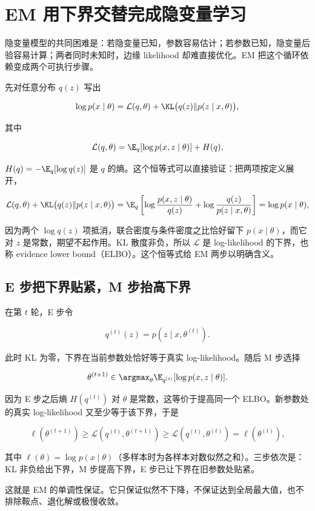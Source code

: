 \section{EM 用下界交替完成隐变量学习}

隐变量模型的共同困难是：若隐变量已知，参数容易估计；若参数已知，隐变量后验容易计算；两者同时未知时，边缘 likelihood 却难直接优化。EM 把这个循环依赖变成两个可执行步骤。

先对任意分布 \(q(z)\) 写出

\[
\log p(x\mid\theta)
=\mathcal L(q,\theta)
+\KL
\bigl(q(z)\|p(z\mid x,\theta)\bigr),
\]

其中

\[
\mathcal L(q,\theta)
=\E_q[\log p(x,z\mid\theta)]
+H(q),
\]

\(H(q)=-\E_q[\log q(z)]\) 是 \(q\) 的熵。这个恒等式可以直接验证：把两项按定义展开，

\[
\mathcal L(q,\theta)
+\KL\bigl(q(z)\|p(z\mid x,\theta)\bigr)
=\E_q\left[
\log\frac{p(x,z\mid\theta)}{q(z)}
+\log\frac{q(z)}{p(z\mid x,\theta)}
\right]
=\log p(x\mid\theta),
\]

因为两个 \(\log q(z)\) 项抵消，联合密度与条件密度之比恰好留下 \(p(x\mid\theta)\)，而它对 \(z\) 是常数，期望不起作用。KL 散度非负，所以 \(\mathcal L\) 是 log-likelihood 的下界，也称 evidence lower bound（ELBO）。这个恒等式给 EM 两步以明确含义。

\subsection{E 步把下界贴紧，M 步抬高下界}

在第 \(t\) 轮，E 步令

\[
q^{(t)}(z)
=p(z\mid x,\theta^{(t)}).
\]

此时 KL 为零，下界在当前参数处恰好等于真实 log-likelihood。随后 M 步选择

\[
\theta^{(t+1)}
\in\argmax_\theta
\E_{q^{(t)}}
[\log p(x,z\mid\theta)].
\]

因为 E 步之后熵 \(H(q^{(t)})\) 对 \(\theta\) 是常数，这等价于提高同一个 ELBO。新参数处的真实 log-likelihood 又至少等于该下界，于是

\[
\ell(\theta^{(t+1)})
\ge\mathcal L(q^{(t)},\theta^{(t+1)})
\ge\mathcal L(q^{(t)},\theta^{(t)})
=\ell(\theta^{(t)}),
\]

其中 \(\ell(\theta)=\log p(x\mid\theta)\)（多样本时为各样本对数似然之和）。三步依次是：KL 非负给出下界，M 步提高下界，E 步已让下界在旧参数处贴紧。

这就是 EM 的单调性保证。它只保证似然不下降，不保证达到全局最大值，也不排除鞍点、退化解或极慢收敛。

